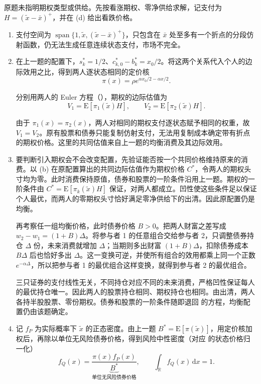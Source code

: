 \begin{solution}[blank-type=manual,blank-vsep=12\baselineskip]
原题未指明期权类型或供给。先按看涨期权、零净供给求解，记支付为 $H=(\widetilde x-\bar x)^+$，并在 (d) 给出看跌价格。
\begin{enumerate}[label=(\alph*)]
\item 支付空间为 $\operatorname{span}\{1,\widetilde x,(\widetilde x-\bar x)^+\}$，只包含在 $\bar x$ 处至多有一个折点的分段仿射函数，仍无法生成任意连续状态支付，市场不完全。
\item 在上一题的配置下，$s_k^*=1/2$、$c_{k,0}^*-b_k^*=x_0/2$。将这两个关系代入个人的边际效用之比，得到两人逐状态相同的定价核
\[
 \pi(x)=\rho e^{\alpha x_0/2-\alpha x/2}.
\]

分别用两人的 Euler 方程\ifdefined\WJHandoutKnowledge（）\fi，期权的边际估值为
\[
 V_1=\mathrm E[\pi_1(\widetilde x)H],\qquad
 V_2=\mathrm E[\pi_2(\widetilde x)H].
\]

由于 $\pi_1(x)=\pi_2(x)$，两人对相同的期权支付逐状态赋予相同的权重，故 $V_1=V_2$。原有股票和债券只能复制仿射支付，无法用复制成本确定带有折点的期权价格。这里的共同估值来自上一题的均衡消费及其边际效用。
\item 要判断引入期权会不会改变配置，先验证能否按一个共同价格维持原来的消费。以 (b) 在原配置算出的共同边际估值作为期权价格 $C^*$，令两人的期权头寸均为零。此时消费保持原值，债券和股票的一阶条件沿用上一题。期权的一阶条件由 $C^*=\mathrm E[\pi_k(\widetilde x)H]$ 保证，对两人都成立。凹性使这些条件足以保证个人最优，而两人的零期权头寸恰好满足零净供给下的出清。因此原配置仍是均衡。

再考察任一组均衡价格，此时债券价格 $B>0$。把两人财富之差写成 $w_2-w_1=(1+B)\Delta$。将参与者 1 的任意组合交给参与者 2，只调整债券持仓 $\Delta$ 份，未来消费就增加 $\Delta$；当期则多出财富 $(1+B)\Delta$，扣除债券成本 $B\Delta$ 后也恰好多出 $\Delta$。这一变换可逆，并使所有组合的效用都乘上同一个正数 $e^{-\alpha\Delta}$，所以把参与者 1 的最优组合这样变换，就得到参与者 2 的最优组合。

三只证券的支付线性无关，不同持仓对应不同的未来消费，严格凹性保证每人的最优持仓唯一。因此两人的股票持仓相同、期权持仓也相同。由出清，两人各持半股股票、零份期权。债券和股票的一阶条件随即退回 的方程，均衡配置仍由该题确定。

\item 记 $f_P$ 为实际概率下 $\widetilde x$ 的正态密度。由上一题 $B^*=\mathrm E[\pi(\widetilde x)]$，用定价核加权后，再除以单位无风险债券价格，得到风险中性密度\ifdefined\WJHandoutKnowledge（对应 的状态价格归一化）\fi
\[
 f_Q(x)=\frac{\pi(x)f_P(x)}{\underbrace{B^*}_{\text{单位无风险债券价格}}},
 \qquad \int_{\mathbb R}f_Q(x)\,\mathrm dx=1.
\]


\end{enumerate}
\end{solution}
